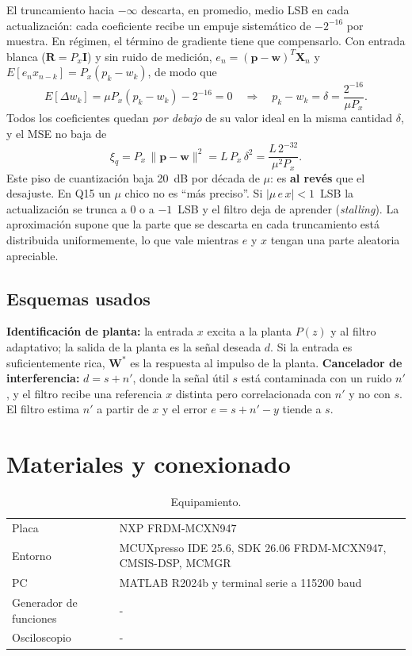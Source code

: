 \documentclass[11pt,a4paper]{article}
\begin{document}
El truncamiento hacia $-\infty$ descarta, en promedio, medio LSB en cada actualización: cada
coeficiente recibe un empuje sistemático de $-2^{-16}$ por muestra. En régimen, el
término de gradiente tiene que compensarlo. Con entrada blanca ($\mathbf{R} = P_x\mathbf{I}$) y
sin ruido de medición, $e_n = (\mathbf{p}-\mathbf{w})^T\mathbf{X}_n$ y
$E[e_n x_{n-k}] = P_x(p_k - w_k)$, de modo que
\begin{equation}
  E[\Delta w_k] = \mu P_x (p_k - w_k) - 2^{-16} = 0
  \quad\Rightarrow\quad
  p_k - w_k = \delta = \frac{2^{-16}}{\mu P_x}. \label{eq:sesgo}
\end{equation}
Todos los coeficientes quedan \emph{por debajo} de su valor ideal en la misma cantidad
$\delta$, y el MSE no baja de
\begin{equation}
  \xi_{q} = P_x\,\|\mathbf{p}-\mathbf{w}\|^2 = L\,P_x\,\delta^2 = \frac{L\,2^{-32}}{\mu^2 P_x}. \label{eq:piso}
\end{equation}
Este piso de cuantización baja 20~dB por década de $\mu$: es \textbf{al revés} que el desajuste.
En Q15 un $\mu$ chico no es ``más preciso''. Si $|\mu\, e\, x| < 1$~LSB la actualización se
trunca a 0 o a $-1$~LSB y el filtro deja de aprender (\emph{stalling}). La aproximación supone que
la parte que se descarta en cada truncamiento está distribuida uniformemente, lo que vale mientras $e$
y $x$ tengan una parte aleatoria apreciable.

\subsection{Esquemas usados}
\textbf{Identificación de planta:} la entrada $x$ excita a la planta $P(z)$ y al filtro
adaptativo; la salida de la planta es la señal deseada $d$. Si la entrada es suficientemente
rica, $\mathbf{W}^*$ es la respuesta al impulso de la planta.
\textbf{Cancelador de interferencia:} $d = s + n'$, donde la señal útil $s$ está contaminada con
un ruido $n'$, y el filtro recibe una referencia $x$ distinta pero correlacionada con $n'$ y no
con $s$. El filtro estima $n'$ a partir de $x$ y el error $e = s + n' - y$ tiende a $s$.

\section{Materiales y conexionado}
\begin{table}[H]
\centering
\caption{Equipamiento.}
\small
\begin{tabular}{ll}
\toprule
Placa & NXP FRDM-MCXN947 \\
Entorno & MCUXpresso IDE 25.6, SDK 26.06 FRDM-MCXN947, CMSIS-DSP, MCMGR \\
PC & MATLAB R2024b y terminal serie a 115200 baud \\
Generador de funciones & - \\
Osciloscopio & - \\
\bottomrule
\end{tabular}
\end{table}
\end{document}
